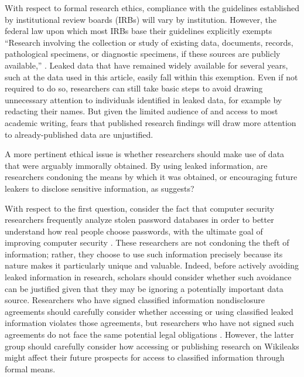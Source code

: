 \documentclass[12pt]{article}
\begin{document}
With respect to formal research ethics, compliance with the guidelines established by institutional review boards (IRBs) will vary by institution. 
However, the federal law upon which most IRBs base their guidelines explicitly exempts 
``Research involving the collection or study of existing data, documents, records, pathological specimens, or diagnostic
specimens, if these sources are publicly available,'' \citep[45 CFR 46.101 (b)(4)]{u.s._government2009code}.
Leaked data that have remained widely available for several years, such at the data used in this article, 
easily fall within this exemption.
Even if not required to do so, researchers can still take basic steps to avoid drawing unnecessary attention 
to individuals identified in leaked data, for example by redacting their names. But given the limited audience of 
and access to most academic writing, fears that published research findings will draw more attention to 
already-published data are unjustified.

A more pertinent ethical issue is whether researchers should make use of data that were arguably 
immorally obtained. By using leaked information, are researchers condoning the means by which it was 
obtained, or encouraging future leakers to disclose sensitive information, as \citet{conway2013why} suggests?

With respect to the first question, consider the fact that computer security researchers frequently 
analyze stolen password databases in order to 
better understand how real people choose passwords, with the ultimate goal of improving computer 
security \citep{imperva2010imperva,bbc2013`123456}.
These researchers are not condoning the theft of information; rather, 
they choose to use such information precisely because its nature makes it particularly unique and 
valuable. Indeed, before actively avoiding leaked information in research, scholars should consider 
whether such avoidance can be justified given that they may be ignoring a potentially important 
data source. Researchers who have signed classified information nondisclosure 
agreements should 
carefully consider whether accessing or using classified leaked information violates those agreements, 
but researchers who have not signed such agreements do not face the same potential legal 
obligations \citep{cox2011wikileaks}. However, the latter group should carefully consider 
how accessing or publishing research on Wikileaks might affect their future prospects for access to 
classified information through formal means.
\end{document}
